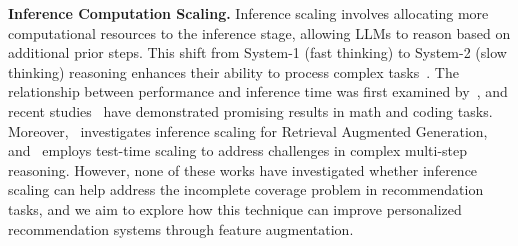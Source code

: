 \textbf{Inference Computation Scaling.} Inference scaling involves allocating more computational resources to the inference stage, allowing LLMs to reason based on additional prior steps. This shift from System-1 (fast thinking) to System-2 (slow thinking) reasoning enhances their ability to process complex tasks~\citep{ji2025test}. The relationship between performance and inference time was first examined by~\citet{snell2024Scaling}, and recent studies~\citep{qi2024mutual, zhang2024accessing, chen2024alphamath, yang2024qwen2, shao2024deepseekmath} have demonstrated promising results in math and coding tasks. Moreover,~\citet{yue2024inference} investigates inference scaling for Retrieval Augmented Generation, and~\citet{sun2025rearter} employs test-time scaling to address challenges in complex multi-step reasoning.
However, none of these works have investigated whether inference scaling can help address the incomplete coverage problem in recommendation tasks, and we aim to explore how this technique can improve personalized recommendation systems through feature augmentation.